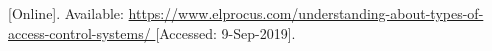 \begin{thebibliography}{9}


[Online]. Available:
\url{
https://www.elprocus.com/understanding-about-types-of-access-control-systems/
}
[Accessed: 9-Sep-2019].


































\end{thebibliography}